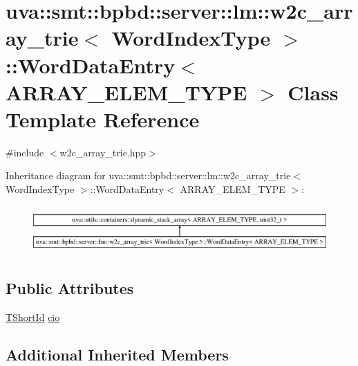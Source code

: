 \hypertarget{classuva_1_1smt_1_1bpbd_1_1server_1_1lm_1_1w2c__array__trie_1_1_word_data_entry}{}\section{uva\+:\+:smt\+:\+:bpbd\+:\+:server\+:\+:lm\+:\+:w2c\+\_\+array\+\_\+trie$<$ Word\+Index\+Type $>$\+:\+:Word\+Data\+Entry$<$ A\+R\+R\+A\+Y\+\_\+\+E\+L\+E\+M\+\_\+\+T\+Y\+P\+E $>$ Class Template Reference}
\label{classuva_1_1smt_1_1bpbd_1_1server_1_1lm_1_1w2c__array__trie_1_1_word_data_entry}


{\ttfamily \#include $<$w2c\+\_\+array\+\_\+trie.\+hpp$>$}

Inheritance diagram for uva\+:\+:smt\+:\+:bpbd\+:\+:server\+:\+:lm\+:\+:w2c\+\_\+array\+\_\+trie$<$ Word\+Index\+Type $>$\+:\+:Word\+Data\+Entry$<$ A\+R\+R\+A\+Y\+\_\+\+E\+L\+E\+M\+\_\+\+T\+Y\+P\+E $>$\+:\begin{figure}[H]
\begin{center}
\leavevmode
\includegraphics[height=1.857380cm]{classuva_1_1smt_1_1bpbd_1_1server_1_1lm_1_1w2c__array__trie_1_1_word_data_entry}
\end{center}
\end{figure}
\subsection*{Public Attributes}
\begin{DoxyCompactItemize}
\item 
\hyperlink{namespaceuva_1_1smt_1_1bpbd_1_1server_1_1lm_1_1identifiers_a33043a191e9a637dea742a89d23c8bdc}{T\+Short\+Id} \hyperlink{classuva_1_1smt_1_1bpbd_1_1server_1_1lm_1_1w2c__array__trie_1_1_word_data_entry_a468e782af0947e287526f60ea3c86d1d}{cio}
\end{DoxyCompactItemize}
\subsection*{Additional Inherited Members}


